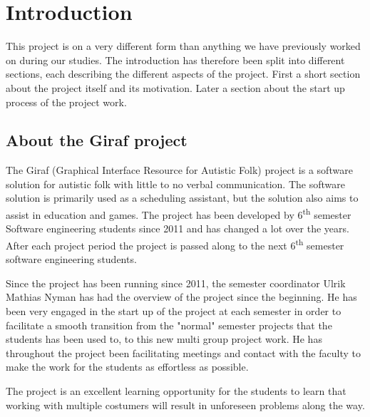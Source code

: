\chapter{Introduction}
This project is on a very different form than anything we have previously worked on during our studies.
The introduction has therefore been split into different sections, each describing the different aspects of the project.
First a short section about the project itself and its motivation.
Later a section about the start up process of the project work.

\section{About the Giraf project}
The Giraf (Graphical Interface Resource for Autistic Folk) project is a software solution for autistic folk with little to no verbal communication.
The software solution is primarily used as a scheduling assistant, but the solution also aims to assist in education and games.
The project has been developed by 6\textsuperscript{th} semester Software engineering students since 2011 and has changed a lot over the years.
After each project period the project is passed along to the next 6\textsuperscript{th} semester software engineering students.

Since the project has been running since 2011, the semester coordinator Ulrik Mathias Nyman  has had the overview of the project since the beginning.
He has been very engaged in the start up of the project at each semester in order to facilitate a smooth transition from the "normal" semester projects that the students has been used to, to this new multi group project work.
He has throughout the project been facilitating meetings and contact with the faculty to make the work for the students as effortless as possible.

The project is an excellent learning opportunity for the students to learn that working with multiple costumers will result in unforeseen problems along the way.

